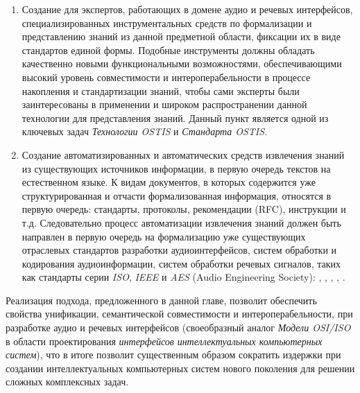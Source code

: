 \begin{enumerate}
  \item Создание для экспертов, работающих в домене аудио и речевых интерфейсов, специализированных инструментальных средств по формализации и представлению знаний из данной предметной области, фиксации их в виде стандартов единой формы. Подобные инструменты должны обладать качественно новыми функциональными возможностями, обеспечивающими высокий уровень совместимости и интероперабельности в процессе накопления и стандартизации знаний, чтобы сами эксперты были заинтересованы в применении и широком распространении данной технологии для представления знаний. Данный пункт является одной из ключевых задач \textit{Технологии OSTIS} и \textit{Стандарта OSTIS}.
  \item Создание автоматизированных и автоматических средств извлечения знаний из существующих источников информации, в первую очередь текстов на естественном языке. К видам документов, в которых содержится уже структурированная и отчасти формализованная информация, относятся в первую очередь: стандарты, протоколы, рекомендации (RFC), инструкции и т.д. Следовательно процесс автоматизации извлечения знаний должен быть направлен в первую очередь на формализацию уже существующих отраслевых стандартов разработки аудиоинтерфейсов, систем обработки и кодирования аудиоинформации, систем обработки речевых сигналов, таких как стандарты серии \textit{ISO}, \textit{IEEE} и \textit{AES} (Audio Engineering Society): , , , , .
\end{enumerate}

Реализация подхода, предложенного в данной главе, позволит обеспечить свойства унификации, семантической совместимости и интероперабельности, при разработке аудио и речевых интерфейсов (своеобразный аналог \textit{Модели OSI/ISO} в области проектирования \textit{интерфейсов} \textit{интеллектуальных компьютерных систем}), что в итоге позволит существенным образом сократить издержки при создании интеллектуальных компьютерных систем нового поколения для решении сложных комплексных задач.


%